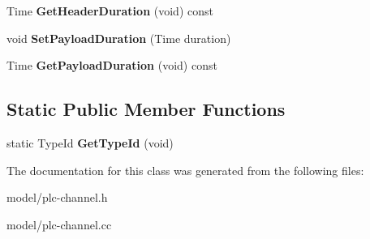 \begin{DoxyCompactItemize}
\item 
\hypertarget{classns3_1_1PLC__TrxMetaInfo_a7ca57747bbd5c2fcea961067cdd6bd6e}{\-Time {\bfseries \-Get\-Header\-Duration} (void) const }\label{classns3_1_1PLC__TrxMetaInfo_a7ca57747bbd5c2fcea961067cdd6bd6e}

\item 
\hypertarget{classns3_1_1PLC__TrxMetaInfo_ac854a6d532d03c310af7986bef052008}{void {\bfseries \-Set\-Payload\-Duration} (\-Time duration)}\label{classns3_1_1PLC__TrxMetaInfo_ac854a6d532d03c310af7986bef052008}

\item 
\hypertarget{classns3_1_1PLC__TrxMetaInfo_af41e702d75de8518661fc4a019dd211b}{\-Time {\bfseries \-Get\-Payload\-Duration} (void) const }\label{classns3_1_1PLC__TrxMetaInfo_af41e702d75de8518661fc4a019dd211b}

\end{DoxyCompactItemize}
\subsection*{\-Static \-Public \-Member \-Functions}
\begin{DoxyCompactItemize}
\item 
\hypertarget{classns3_1_1PLC__TrxMetaInfo_acfa8aebc59d7723a5666c2696efd83a3}{static \-Type\-Id {\bfseries \-Get\-Type\-Id} (void)}\label{classns3_1_1PLC__TrxMetaInfo_acfa8aebc59d7723a5666c2696efd83a3}

\end{DoxyCompactItemize}


\-The documentation for this class was generated from the following files\-:\begin{DoxyCompactItemize}
\item 
model/plc-\/channel.\-h\item 
model/plc-\/channel.\-cc\end{DoxyCompactItemize}
